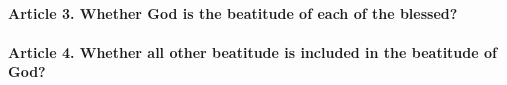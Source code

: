 \documentclass{ucetd}
\begin{document}
\paragraph{Article 3. Whether God is the beatitude of each of the blessed?}
\paragraph{Article 4. Whether all other beatitude is included in the beatitude of God?}
\end{document}
